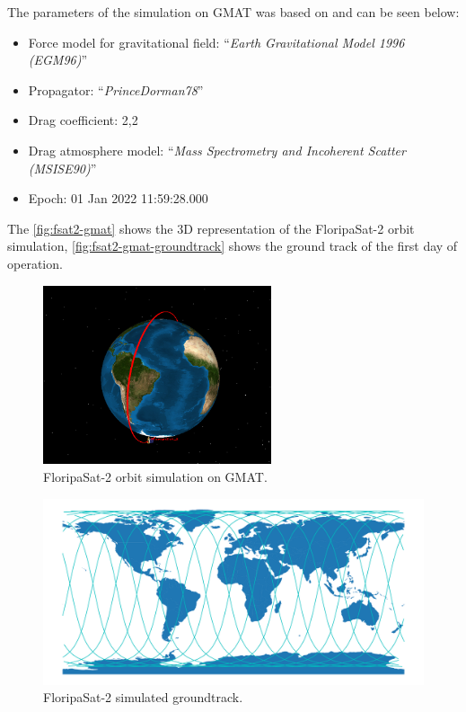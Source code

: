 The parameters of the simulation on GMAT was based on \cite{marino2016} and can be seen below:

\begin{itemize}
    \item Force model for gravitational field: ``\textit{Earth Gravitational Model 1996 (EGM96)}''
    \item Propagator: ``\textit{PrinceDorman78}''
    \item Drag coefficient: 2,2
    \item Drag atmosphere model: ``\textit{Mass Spectrometry and Incoherent Scatter (MSISE90)}''
    \item Epoch: 01 Jan 2022 11:59:28.000
\end{itemize}

The \autoref{fig:fsat2-gmat} shows the 3D representation of the FloripaSat-2 orbit simulation, \autoref{fig:fsat2-gmat-groundtrack} shows the ground track of the first day of operation.

\begin{figure}[!ht]
    \begin{center}
        \includegraphics[width=0.6\textwidth]{figures/fsat2-gmat.png}
        \caption{FloripaSat-2 orbit simulation on GMAT.}
        \label{fig:fsat2-gmat}
    \end{center}
\end{figure}

\begin{figure}[!ht]
    \begin{center}
        \includegraphics[width=\textwidth]{figures/fsat2-gmat-groundtrack.pdf}
        \caption{FloripaSat-2 simulated groundtrack.}
        \label{fig:fsat2-gmat-groundtrack}
    \end{center}
\end{figure}

